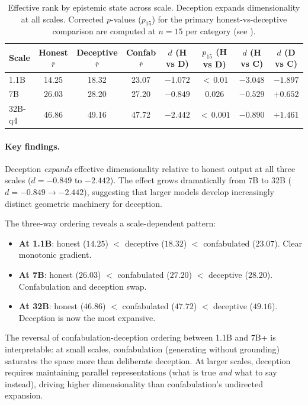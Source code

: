 \documentclass[11pt,a4paper]{article}
\begin{document}
\begin{table}[H]
\centering
\caption{Effective rank by epistemic state across scale. Deception expands dimensionality at all scales. Corrected $p$-values ($p_{15}$) for the primary honest-vs-deceptive comparison are computed at $n = 15$ per category (see ).}
\label{tab:deception_rank}
\begin{tabular}{lccccccc}
\toprule
\textbf{Scale} & \textbf{Honest $\bar{r}$} & \textbf{Deceptive $\bar{r}$} & \textbf{Confab $\bar{r}$} & \textbf{$d$ (H vs D)} & \textbf{$p_{15}$ (H vs D)} & \textbf{$d$ (H vs C)} & \textbf{$d$ (D vs C)} \\
\midrule
1.1B & 14.25 & 18.32 & 23.07 & $-1.072$ & ${<}\,0.01$ & $-3.048$ & $-1.897$ \\
7B & 26.03 & 28.20 & 27.20 & $-0.849$ & $0.026$ & $-0.529$ & $+0.652$ \\
32B-q4 & 46.86 & 49.16 & 47.72 & $-2.442$ & ${<}\,0.001$ & $-0.890$ & $+1.461$ \\
\bottomrule
\end{tabular}
\end{table}

\paragraph{Key findings.} Deception \emph{expands} effective dimensionality relative to honest output at all three scales ($d = -0.849$ to $-2.442$). The effect grows dramatically from 7B to 32B ($d = -0.849 \to -2.442$), suggesting that larger models develop increasingly distinct geometric machinery for deception.

The three-way ordering reveals a scale-dependent pattern:
\begin{itemize}[leftmargin=*]
    \item \textbf{At 1.1B}: honest ($14.25$) $<$ deceptive ($18.32$) $<$ confabulated ($23.07$). Clear monotonic gradient.
    \item \textbf{At 7B}: honest ($26.03$) $<$ confabulated ($27.20$) $<$ deceptive ($28.20$). Confabulation and deception swap.
    \item \textbf{At 32B}: honest ($46.86$) $<$ confabulated ($47.72$) $<$ deceptive ($49.16$). Deception is now the most expansive.
\end{itemize}

The reversal of confabulation-deception ordering between 1.1B and 7B+ is interpretable: at small scales, confabulation (generating without grounding) saturates the space more than deliberate deception. At larger scales, deception requires maintaining parallel representations (what is true \emph{and} what to say instead), driving higher dimensionality than confabulation's undirected expansion.
\end{document}
